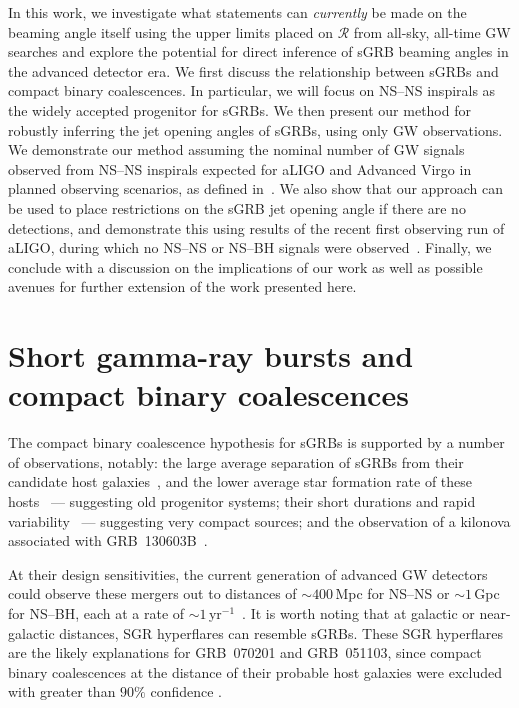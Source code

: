\documentclass[twocolumn,nofootinbib]{revtex4-1}
\newcommand{\cbcrate}{{{\mathcal R}}}
\newcommand{\BNS}{\ac{NS}--\ac{NS}\xspace}
\newcommand{\NSBH}{\ac{NS}--\ac{BH}\xspace}
\newcommand{\arw}[1]{{\color{dgreen}{#1}}}
\begin{document}
In this work, we investigate what statements can \emph{currently} be made on the beaming angle itself using the upper limits placed on $\cbcrate$ from all-sky, all-time \ac{GW} searches and explore the potential for direct inference of \ac{sGRB}  beaming angles in the advanced detector era.
We first discuss the relationship between \acp{sGRB} and compact binary coalescences.
In particular, we will focus on \BNS inspirals as the widely accepted progenitor for \acp{sGRB}.
We then present our method for robustly inferring the jet opening angles of \acp{sGRB}, using only \ac{GW} observations.
We demonstrate our method assuming the nominal number of \ac{GW} signals observed from \BNS inspirals expected for \ac{aLIGO} and Advanced Virgo in planned \arw{`2017--2018' and `2022+'?} observing scenarios, as defined in~\cite{Aasi:2013wya}.
We also show that our approach can be used to place restrictions on the \ac{sGRB} jet opening angle if there are no detections, and demonstrate this using results of the recent first observing run of \ac{aLIGO}, during which no \BNS or \NSBH signals were observed~\cite{Abbott:2016ymx}.
Finally, we conclude with a discussion on the implications of our work as well as possible avenues for further extension of the work presented here.


\section{Short gamma-ray bursts and compact binary coalescences}
\label{sec:sgrbs}
The compact binary coalescence hypothesis for \acp{sGRB} is supported by a number of observations, notably: the large average separation of \acp{sGRB} from their candidate host galaxies~\cite{Church:2011gk}, and the lower average star formation rate of these hosts~\cite{Fong:2013eqa} --- suggesting old progenitor systems; their short durations and rapid variability~\cite{Rees:1994nw} --- suggesting very compact sources; and the observation of a kilonova associated with GRB~130603B~\cite{Berger:2013wna,Tanvir:2013pia}.

At their design sensitivities, the current generation of advanced \ac{GW} detectors could observe these mergers out to distances of $\sim 400\,$Mpc for \BNS or $\sim 1\,$Gpc for \NSBH, each at a rate of $\sim 1\,$yr$^{-1}$~\cite{Aasi:2013wya}.
It is worth noting that at galactic or near-galactic distances, \ac{SGR} hyperflares can resemble \acp{sGRB}.
These \ac{SGR} hyperflares are the likely explanations for GRB~070201 and GRB~051103, since compact binary coalescences at the distance of their probable host galaxies were excluded with greater than $90\%$ confidence \cite{Abbott:2007rh,Abadie:2012bz}. 
\end{document}
